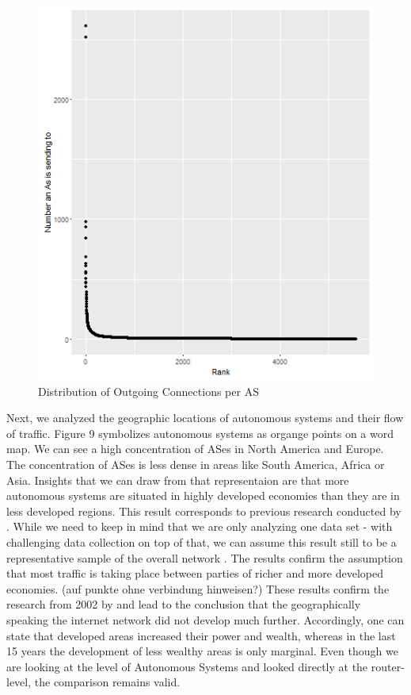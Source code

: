 \documentclass[conference, 11pt]{IEEEtran}
\begin{document}
\begin{figure}[htbp]
\centerline{\includegraphics[scale=0.4]{Graphics/AsFromDistribution.png}}
\caption{Distribution of Outgoing Connections per AS}
\label{fig}
\end{figure}



Next, we analyzed the geographic locations of autonomous systems and their flow of traffic. Figure 9 symbolizes autonomous systems as organge points on a word map. We can see a high concentration of ASes in North America and Europe. The concentration of ASes is less dense in areas like South America, Africa or Asia. Insights that we can draw from that representaion are that more autonomous systems are situated in highly developed economies  than they are in less developed regions. This result corresponds to previous research conducted by \cite{ResearchGeo}. While we need to keep in mind that we are only analyzing one data set - with challenging data collection on top of that, we can assume this result still to be a representative sample of the overall network \cite{CaidaDataCollection}. The results confirm the assumption that most traffic is taking place between parties of richer and more developed economies.  (auf punkte ohne verbindung hinweisen?)
These results confirm the research from 2002 by \cite{geoResearch} and lead to the conclusion that the geographically speaking the internet network did not develop much further. Accordingly, one can state that developed areas increased their power and wealth, whereas in the last 15 years the development of less wealthy areas is only marginal. Even though we are looking at the level of Autonomous Systems and \cite{geoResearch} looked directly at the router-level, the comparison remains valid. \\
\end{document}
